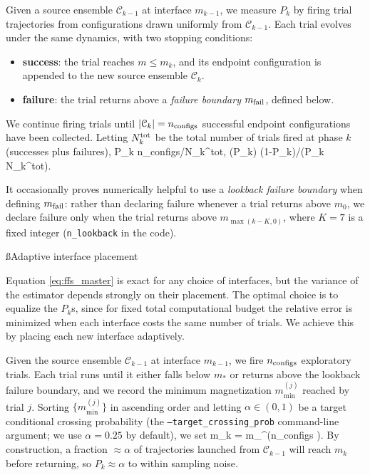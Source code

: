 \documentclass[12pt]{article}
\begin{document}
Given a source ensemble $\mathcal{C}_{k-1}$ at interface $m_{k-1}$, we measure $P_k$ by firing trial trajectories from configurations drawn uniformly from $\mathcal{C}_{k-1}$. Each trial evolves under the same dynamics, with two stopping conditions:
\begin{itemize}
\item {\bf success}: the trial reaches $m \le m_k$, and its endpoint configuration is appended to the new source ensemble $\mathcal{C}_k$.
\item {\bf failure}: the trial returns above a {\it failure boundary} $m_{\rm fail}$, defined below.
\end{itemize}
We continue firing trials until $|\mathcal{C}_k| = n_{\rm configs}$ successful endpoint configurations have been collected. Letting $N_k^{\rm tot}$ be the total number of trials fired at phase $k$ (successes plus failures),
\be P_k \approx n_{\rm configs}/N_k^{\rm tot}, \quad {}(\ln P_k) \approx (1-P_k)/(P_k N_k^{\rm tot}).\ee

It occasionally proves numerically helpful to use a {\it lookback failure boundary} when defining $m_{\rm fail}$: rather than declaring failure whenever a trial returns above $m_0$, we declare failure only when the trial returns above $m_{\max(k-K,0)}$, where $K = 7$ is a fixed integer (\texttt{n\_lookback} in the code). 

\ss{Adaptive interface placement}

Equation \eqref{eq:ffs_master} is exact for any choice of interfaces, but the variance of the estimator depends strongly on their placement. The optimal choice is to equalize the $P_k$s, since for fixed total computational budget the relative error is minimized when each interface costs the same number of trials. We achieve this by placing each new interface adaptively.

Given the source ensemble $\mathcal{C}_{k-1}$ at interface $m_{k-1}$, we fire $n_{\rm configs}$ exploratory trials. Each trial runs until it either falls below $m_*$ or returns above the lookback failure boundary, and we record the minimum magnetization $m_{\min}^{(j)}$ reached by trial $j$. Sorting $\{m_{\min}^{(j)}\}$ in ascending order and letting $\alpha \in (0,1)$ be a target conditional crossing probability (the \texttt{--target\_crossing\_prob} command-line argument; we use $\alpha = 0.25$ by default), we set
\be m_k = m_{\min}^{(\lceil \alpha n_{\rm configs} \rceil)}.\ee
By construction, a fraction $\approx \alpha$ of trajectories launched from $\mathcal{C}_{k-1}$ will reach $m_k$ before returning, so $P_k \approx \alpha$ to within sampling noise. 
\end{document}
